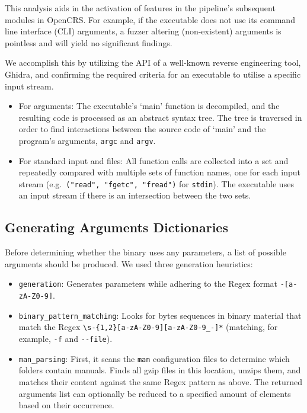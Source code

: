 \documentclass[../main.tex]{subfiles}
\begin{document}
This analysis aids in the activation of features in the pipeline's
subsequent modules in OpenCRS. For example, if the executable does not
use its command line interface (CLI) arguments, a fuzzer altering (non-existent) arguments
is pointless and will yield no significant findings.

We accomplish this by utilizing the API of a well-known reverse
engineering tool, Ghidra, and confirming the required criteria for
an executable to utilise a specific input stream.

\begin{itemize}
\tightlist
\item
  For arguments: The executable's `main' function is decompiled, and the
  resulting code is processed as an abstract syntax tree. The tree is traversed in order
  to find interactions between the source code of `main' and the
  program's arguments, \texttt{argc} and \texttt{argv}.
\item
  For standard input and files: All function calls are collected into a
  set and repeatedly compared with multiple sets of function names, one
  for each input stream (e.g.~\texttt{("read",\ "fgetc",\ "fread")} for
  \texttt{stdin}). The executable uses an input stream if there is an
  intersection between the two sets.
\end{itemize}

\hypertarget{generating-arguments-dictionaries}{%
\subsection{Generating Arguments
Dictionaries}\label{generating-arguments-dictionaries}}

Before determining whether the binary uses any parameters, a list of
possible arguments should be produced. We used three generation
heuristics:

\begin{itemize}
\tightlist
\item
  \texttt{generation}: Generates parameters while adhering to the
  Regex format \texttt{-{[}a-zA-Z0-9{]}}.
\item
  \texttt{binary\_pattern\_matching}: Looks for bytes sequences in
  binary material that match the Regex
  \texttt{\textbackslash{}s-\{1,2\}{[}a-zA-Z0-9{]}{[}a-zA-Z0-9\_-{]}*}
  (matching, for example, \texttt{-f} and \texttt{-\/-file}).
\item
  \texttt{man\_parsing}: First, it scans the \texttt{man} configuration
  files to determine which folders contain manuals. Finds all gzip files
  in this location, unzips them, and matches their content against
  the same Regex pattern as above. The returned arguments list can
  optionally be reduced to a specified amount of elements based on their
  occurrence.
\end{itemize}
\end{document}
